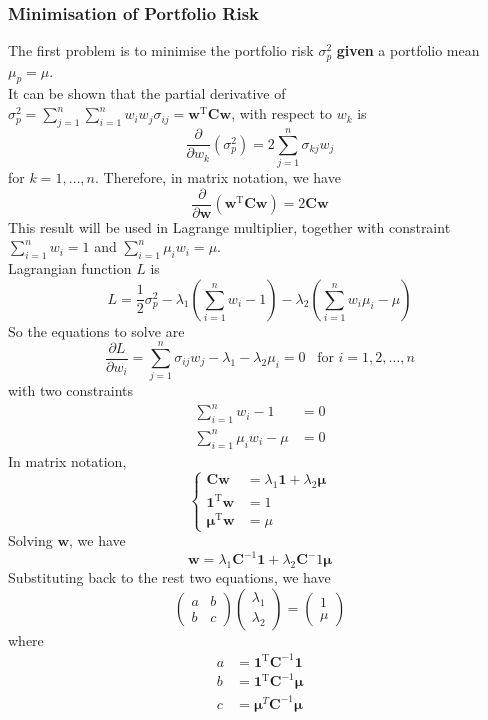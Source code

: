 \documentclass[12pt]{article}
\theoremstyle{definition}
\begin{document}
\subsubsection{Minimisation of Portfolio Risk}
The first problem is to minimise the portfolio risk $\sigma_p^2$ \textbf{given} a portfolio mean $\mu_p=\mu$.\\It can be shown that the partial derivative of $\sigma_p^2 = \sum_{j=1}^n\sum_{i=1}^n w_iw_j\sigma_{ij}=\mathbf{w}^\text{T}\mathbf{Cw}$, with respect to $w_k$ is
\[
\frac{\partial}{\partial w_k}(\sigma_p^2)=2\sum_{j=1}^n\sigma_{kj}w_j
\]
for $k=1,\ldots, n$.
Therefore, in matrix notation, we have
\[
\frac{\partial}{\partial \mathbf{w}}(\mathbf{w}^\text{T}\mathbf{Cw})=2\mathbf{Cw}
\]
This result will be used in Lagrange multiplier, together with constraint $\sum_{i=1}^nw_i=1$ and $\sum_{i=1}^n\mu_iw_i=\mu$.\\
Lagrangian function $L$ is
\[
L=\frac{1}{2}\sigma_p^2-\lambda_1\left(\sum_{i=1}^nw_i-1\right)-\lambda_2\left(\sum_{i=1}^nw_i\mu_i-\mu\right)
\]
So the equations to solve are
\[
\frac{\partial L}{\partial w_i} = \sum_{j=1}^n \sigma_{ij}w_j-\lambda_1-\lambda_2\mu_i=0\;\;\;\text{for }i=1,2,\ldots, n
\]
with two constraints
\begin{align*}
\sum_{i=1}^nw_i-1&=0\\
\sum_{i=1}^n\mu_iw_i-\mu&=0
\end{align*}
In matrix notation,
\[
\begin{cases}
\mathbf{Cw}&=\lambda_1\mathbf{1}+\lambda_2\mathbf{\mu}\\
\mathbf{1}^\text{T}\mathbf{w}&=1\\
\bm{\mu}^\text{T}\mathbf{w}&=\mu
\end{cases}
\]
Solving $\mathbf{w}$, we have
\[
\mathbf{w}=\lambda_1\mathbf{C}^{-1}\mathbf{1}+\lambda_2\mathbf{C}^-1\bm{\mu}
\]
Substituting back to the rest two equations, we have
\[
\begin{pmatrix}a&b\\b&c\end{pmatrix}\begin{pmatrix}\lambda_1\\\lambda_2\end{pmatrix}=\begin{pmatrix}1\\\mu\end{pmatrix}
\]
where
\begin{align*}
a&=\mathbf{1}^\text{T}\mathbf{C}^{-1}\mathbf{1}\\
b&=\mathbf{1}^\text{T}\mathbf{C}^{-1}\bm{\mu}\\
c&=\bm{\mu}^T\mathbf{C}^{-1}\bm{\mu}
\end{align*}
\end{document}
